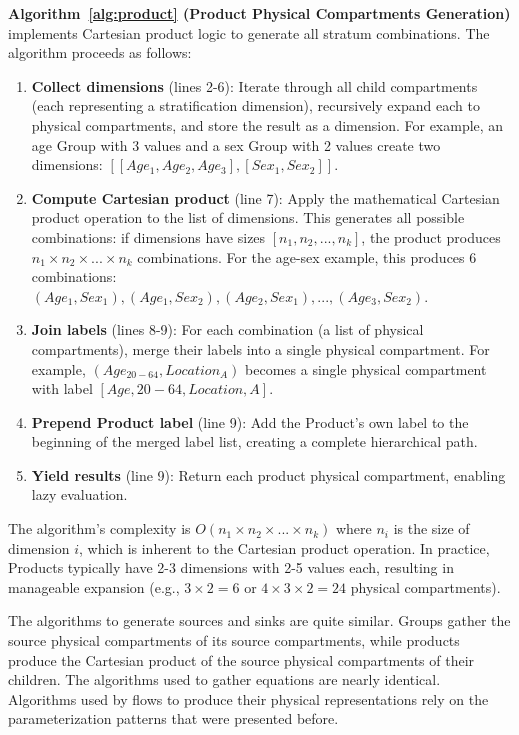 \textbf{Algorithm~\ref{alg:product} (Product Physical Compartments Generation)} implements Cartesian product logic to generate all stratum combinations. The algorithm proceeds as follows:
\begin{enumerate}
    \item \textbf{Collect dimensions} (lines 2-6): Iterate through all child compartments (each representing a stratification dimension), recursively expand each to physical compartments, and store the result as a dimension. For example, an age Group with 3 values and a sex Group with 2 values create two dimensions: $[[Age_1, Age_2, Age_3], [Sex_1, Sex_2]]$.
    \item \textbf{Compute Cartesian product} (line 7): Apply the mathematical Cartesian product operation to the list of dimensions. This generates all possible combinations: if dimensions have sizes $[n_1, n_2, ..., n_k]$, the product produces $n_1 \times n_2 \times ... \times n_k$ combinations. For the age-sex example, this produces 6 combinations: $(Age_1, Sex_1), (Age_1, Sex_2), (Age_2, Sex_1), ..., (Age_3, Sex_2)$.
    \item \textbf{Join labels} (lines 8-9): For each combination (a list of physical compartments), merge their labels into a single physical compartment. For example, $(Age_{20-64}, Location_A)$ becomes a single physical compartment with label $[Age, 20-64, Location, A]$.
    \item \textbf{Prepend Product label} (line 9): Add the Product's own label to the beginning of the merged label list, creating a complete hierarchical path.
    \item \textbf{Yield results} (line 9): Return each product physical compartment, enabling lazy evaluation.
\end{enumerate}
The algorithm's complexity is $O(n_1 \times n_2 \times ... \times n_k)$ where $n_i$ is the size of dimension $i$, which is inherent to the Cartesian product operation. In practice, Products typically have 2-3 dimensions with 2-5 values each, resulting in manageable expansion (e.g., $3 \times 2 = 6$ or $4 \times 3 \times 2 = 24$ physical compartments).



The algorithms to generate sources and sinks are quite similar. Groups gather the source physical compartments of its source compartments, while products produce the Cartesian product of the source physical compartments of their children. The algorithms used to gather equations are nearly identical. Algorithms used by flows to produce their physical representations rely on the parameterization patterns that were presented before.